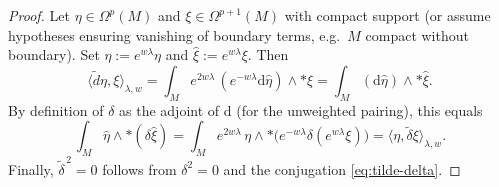 \documentclass[10pt,a4paper]{amsart}
\newcommand{\dd}{\mathrm{d}}
\newcommand{\wtd}{\tilde d}
\newcommand{\wtdel}{\tilde\delta}
\begin{document}
\begin{proof}
Let $\eta\in\Omega^{p}(M)$ and $\xi\in\Omega^{p+1}(M)$ with compact support (or assume hypotheses ensuring vanishing of boundary terms, e.g.\ $M$ compact without boundary). Set $\hat\eta:=e^{w\lambda}\eta$ and $\hat\xi:=e^{w\lambda}\xi$.
Then
\[
\langle \wtd\eta,\xi\rangle_{\lambda,w}
=
\int_M e^{2w\lambda}\,(e^{-w\lambda}\dd\hat\eta)\wedge *\xi
=
\int_M (\dd\hat\eta)\wedge *\hat\xi.
\]
By definition of $\delta$ as the adjoint of $\dd$ (for the unweighted pairing), this equals
\[
\int_M \hat\eta\wedge *(\delta\hat\xi)
=
\int_M e^{2w\lambda}\,\eta\wedge *\big(e^{-w\lambda}\delta(e^{w\lambda}\xi)\big)
=
\langle \eta,\wtdel\xi\rangle_{\lambda,w}.
\]
Finally, $\wtdel^{\,2}=0$ follows from $\delta^2=0$ and the conjugation \eqref{eq:tilde-delta}.
\end{proof}
\end{document}
